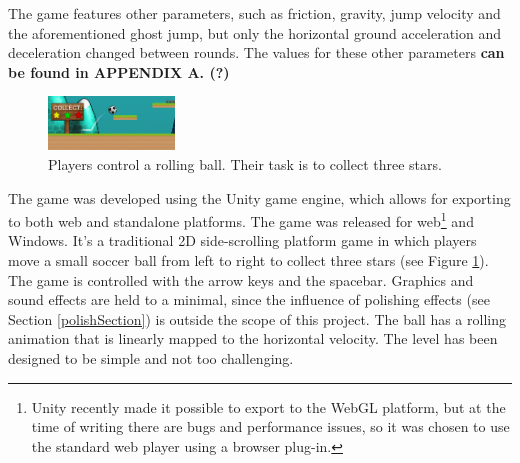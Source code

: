The game features other parameters, such as friction, gravity, jump velocity and the aforementioned ghost jump, but only the horizontal ground acceleration and deceleration changed between rounds. The values for these other parameters \textbf{can be found in APPENDIX A. (?)}

\begin{figure}[htbp]
\centering
\includegraphics[width=0.3\textwidth]{Pics/gf}
\caption{Players control a rolling ball. Their task is to collect three stars.}
\label{fig:game}
\end{figure}

The game was developed using the Unity game engine, which allows for exporting to both web and standalone platforms. The game was released for web\footnote{Unity recently made it possible to export to the WebGL platform, but at the time of writing there are bugs and performance issues, so it was chosen to use the standard web player using a browser plug-in.} and Windows. It's a traditional 2D side-scrolling platform game in which players move a small soccer ball from left to right to collect three stars (see Figure \ref{fig:game}). The game is controlled with the arrow keys and the spacebar. Graphics and sound effects are held to a minimal, since the influence of polishing effects (see Section \ref{polishSection}) is outside the scope of this project. The ball has a rolling animation that is linearly mapped to the horizontal velocity. The level has been designed to be simple and not too challenging.
